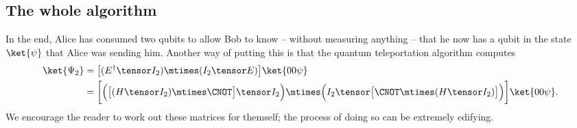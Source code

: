 \subsection{The whole algorithm}\label{sec:whole-algorithm}
In the end, Alice has consumed two qubits to allow Bob to know -- without
measuring anything -- that he now has a qubit in the state $\ket{\psi}$ that
Alice was sending him.  Another way of putting this is that the quantum
teleportation algorithm computes
\begin{align*}
  \ket{\Psi_2}
    &= \big[(E^\dag \tensor I_2) \mtimes (I_2 \tensor E)\big]\ket{00\psi} \\
    &= \bigg[
         \Big(\big[(H \tensor I_2) \mtimes \CNOT\big] \tensor I_2\Big)
         \mtimes
         \Big(I_2 \tensor \big[\CNOT \mtimes (H \tensor I_2)\big]\Big)
       \bigg]\ket{00\psi}.
\end{align*}
We encourage the reader to work out these matrices for themself; the process of
doing so can be extremely edifying.